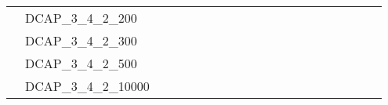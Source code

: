 \begin{table}[H]
{\begin{tabular}{|c|l|lll|lll|lllll|llll|lll|}
			& DCAP\_3\_4\_2\_200            &                          &                         &                          &                          &                         &                          &                          &                         &                         &                          &                           &                             &                             &                             &                               &                          &                          &                           \\
			& DCAP\_3\_4\_2\_300            &                          &                         &                          &                          &                         &                          &                          &                         &                         &                          &                           &                             &                             &                             &                               &                          &                          &                           \\
			& DCAP\_3\_4\_2\_500            &                          &                         &                          &                          &                         &                          &                          &                         &                         &                          &                           &                             &                             &                             &                               &                          &                          &                           \\
			& DCAP\_3\_4\_2\_10000          &                          &                         &                          &                          &                         &                          &                          &                         &                         &                          &                           &                             &                             &                             &                               &                          &                          &                           \\ \hline
		\end{tabular}%
	}
\end{table}
